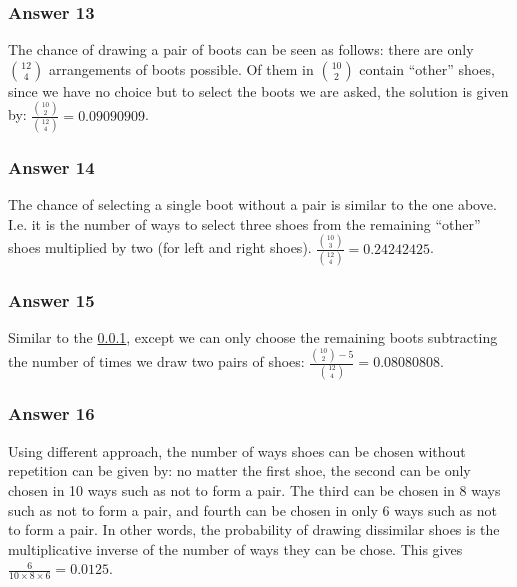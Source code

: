 \documentclass[11pt]{article}
\begin{document}
\subsubsection{Answer 13}
\label{sec-1-4-1}
The chance of drawing a pair of boots can be seen as follows: there are
only $\binom{12}{4}$ arrangements of boots possible.  Of them in 
$\binom{10}{2}$ contain ``other'' shoes, since we have no choice but to
select the boots we are asked, the solution is given by:
$\frac{\binom{10}{2}}{\binom{12}{4}} = \num{0.09090909}$.
\subsubsection{Answer 14}
\label{sec-1-4-2}
The chance of selecting a single boot without a pair is similar to the one
above. I.e. it is the number of ways to select three shoes from the remaining
``other'' shoes multiplied by two (for left and right shoes).
$\frac{\binom{10}{3}}{\binom{12}{4}} = \num{0.24242425}$.
\subsubsection{Answer 15}
\label{sec-1-4-3}
Similar to the \ref{sec-1-4-1}, except we can only choose the remaining boots
subtracting the number of times we draw two pairs of shoes:
$\frac{\binom{10}{2} - 5}{\binom{12}{4}} = \num{0.08080808}$.
\subsubsection{Answer 16}
\label{sec-1-4-4}
Using different approach, the number of ways shoes can be chosen without
repetition can be given by: no matter the first shoe, the second can be
only chosen in 10 ways such as not to form a pair.  The third can be
chosen in 8 ways such as not to form a pair, and fourth can be chosen
in only 6 ways such as not to form a pair.  In other words, the probability
of drawing dissimilar shoes is the multiplicative inverse of the number of
ways they can be chose.  This gives $\frac{6}{10 \times 8 \times 6} = 0.0125$.
\end{document}
